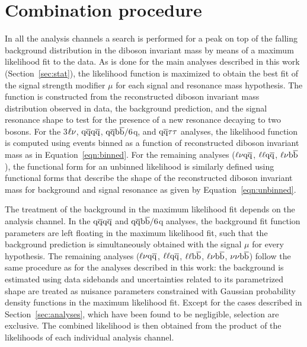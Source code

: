 \section{Combination procedure}\label{sec:combination}

In all the analysis channels a search is performed for a peak on top of the falling background distribution in the diboson invariant mass by means of a maximum likelihood fit to the data.
As is done for the main analyses described in this work (Section~\ref{sec:stat}), the likelihood function is maximized to obtain the best fit of the signal strength modifier $\mu$ for each signal and resonance mass hypothesis.
The function is constructed from the reconstructed diboson invariant mass distribution observed in data, the background prediction, and the signal resonance shape to test for the presence of a new resonance decaying to two bosons.
For the 3$\ell\nu$, $\mathrm{q}\overline{\mathrm{q}} \mathrm{q}\overline{\mathrm{q}}$, $\mathrm{q}\overline{\mathrm{q}}{\mathrm{b}\overline{\mathrm{b}}}/6$q, and $\mathrm{q}\overline{\mathrm{q}} \tau\tau $ analyses, the likelihood function is computed using events binned as a function of reconstructed diboson invariant mass as in Equation~\ref{eqn:binned}.
For the remaining analyses ($\ell \nu \mathrm{q}\overline{\mathrm{q}}$,  $\ell\ell \mathrm{q}\overline{\mathrm{q}}$, $\ell \nu {\mathrm{b}\overline{\mathrm{b}}}$), the functional form for an unbinned likelihood is similarly defined using functional forms that describe the shape of the reconstructed diboson invariant mass for background and signal resonance as given by Equation~\ref{eqn:unbinned}.

The treatment of the background in the maximum likelihood fit depends on the analysis channel.
In the $\mathrm{q}\overline{\mathrm{q}} \mathrm{q}\overline{\mathrm{q}}$ and $\mathrm{q}\overline{\mathrm{q}}{\mathrm{b}\overline{\mathrm{b}}}/6$q analyses, the background fit function parameters are left floating in the maximum likelihood fit, such that the background prediction is simultaneously obtained with the signal $\mu$ for every hypothesis.
The remaining analyses ($\ell \nu \mathrm{q}\overline{\mathrm{q}}$,  $\ell\ell \mathrm{q}\overline{\mathrm{q}}$, $\ell \ell {\mathrm{b}\overline{\mathrm{b}}}$, $\ell \nu {\mathrm{b}\overline{\mathrm{b}}}$, $\nu \nu {\mathrm{b}\overline{\mathrm{b}}}$) follow the same procedure as for the analyses described in this work: the background is estimated using data sidebands and uncertainties related to its parametrized shape are treated as nuisance parameters constrained with Gaussian probability density functions in the maximum likelihood fit. Except for the cases described in Section~\ref{sec:analyses}, which have been found to be negligible, selection are exclusive. The combined likelihood is then obtained from the product of the likelihoods of each individual analysis channel.

